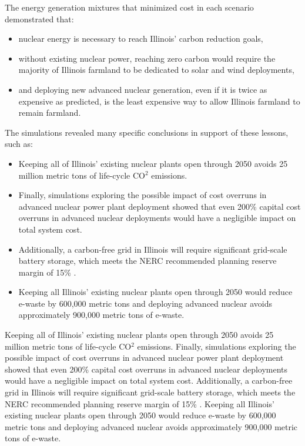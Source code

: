 The energy generation mixtures that minimized cost in each scenario 
demonstrated that:
\begin{itemize}
        \item nuclear energy is necessary to reach Illinois' carbon reduction 
                goals,
        \item without existing nuclear power, reaching zero carbon would 
                require the majority of Illinois farmland to be dedicated to 
                solar and wind deployments,
        \item and deploying new advanced nuclear generation, even if it is 
                twice as expensive as predicted, is the least expensive way to 
                allow Illinois farmland to remain farmland.
  \end{itemize}

The simulations revealed many specific conclusions in support of these lessons, 
such as:
\begin{itemize}
        \item Keeping all of Illinois' existing nuclear plants open through 2050 avoids 25 million metric tons of life-cycle CO$^2$ emissions. 
        \item Finally, simulations exploring the possible impact of cost overruns in advanced nuclear power plant deployment showed that even 200\% capital cost overruns in advanced nuclear deployments would have a negligible impact on total system cost.
        \item Additionally, a carbon-free grid in Illinois will require significant grid-scale battery storage,  which meets the \gls{NERC} recommended planning reserve margin of 15\% \cite{nerc_reserve_margin}.
        \item Keeping all Illinois' existing nuclear plants open through 2050 would reduce e-waste by 600,000 metric tons and deploying advanced nuclear avoids approximately 900,000 metric tons of e-waste. 
\end{itemize}

Keeping all of Illinois' existing nuclear plants open through 2050 avoids 25 million metric tons of life-cycle CO$^2$ emissions. 
Finally, simulations exploring the possible impact of cost overruns in advanced nuclear power plant deployment showed that even 200\% capital cost overruns in advanced nuclear deployments would have a negligible impact on total system cost.
Additionally, a carbon-free grid in Illinois will require significant grid-scale battery storage,  which meets the \gls{NERC} recommended planning reserve margin of 15\% \cite{nerc_reserve_margin}.
Keeping all Illinois' existing nuclear plants open through 2050 would reduce e-waste by 600,000 metric tons and deploying advanced nuclear avoids approximately 900,000 metric tons of e-waste. 

